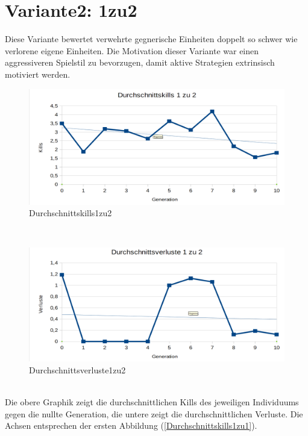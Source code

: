 \documentclass[
	12pt,
	a4paper,
	BCOR10mm,
	DIV14,
	headsepline,
	usegeometry,
]{scrreprt}
\begin{document}
\section{Variante2: 1zu2}
Diese Variante bewertet verwehrte gegnerische Einheiten doppelt so schwer wie verlorene eigene Einheiten. Die Motivation dieser Variante war einen aggressiveren Spielstil zu bevorzugen, damit aktive Strategien extrinsisch motiviert werden.
\begin{figure}[h]
	\includegraphics[width = \textwidth]{Durchschnittskills1zu2.png}
	\caption{Durchschnittskills1zu2}
	\label{Durchschnittskills1zu2}
\end{figure}\\
\begin{figure}[h]
	\includegraphics[width = \textwidth]{Durchschnittsverluste1zu2.png}
	\caption{Durchschnittsverluste1zu2}
	\label{Durchschnittsverluste1zu2}
\end{figure}\\
Die obere Graphik zeigt die durchschnittlichen Kills des jeweiligen Individuums gegen die nullte Generation, die untere zeigt die durchschnittlichen Verluste. Die Achsen entsprechen der ersten Abbildung (\ref{Durchschnittskills1zu1}).\\
\end{document}
